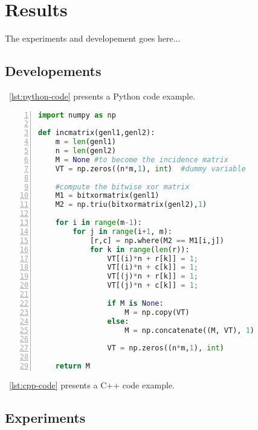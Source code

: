 \chapter{Results}\label{chap:Results}

The experiments and developement goes here...


\section{Developements} \label{sec:dev}


\lstlistingname~\ref{lst:python-code} presents a Python code example.

\begin{lstlisting}[numbers=left, language=Python, style=mycode, caption={Python code example.}, label={lst:python-code}]
import numpy as np
 
def incmatrix(genl1,genl2):
    m = len(genl1)
    n = len(genl2)
    M = None #to become the incidence matrix
    VT = np.zeros((n*m,1), int)  #dummy variable
 
    #compute the bitwise xor matrix
    M1 = bitxormatrix(genl1)
    M2 = np.triu(bitxormatrix(genl2),1) 
 
    for i in range(m-1):
        for j in range(i+1, m):
            [r,c] = np.where(M2 == M1[i,j])
            for k in range(len(r)):
                VT[(i)*n + r[k]] = 1;
                VT[(i)*n + c[k]] = 1;
                VT[(j)*n + r[k]] = 1;
                VT[(j)*n + c[k]] = 1;
 
                if M is None:
                    M = np.copy(VT)
                else:
                    M = np.concatenate((M, VT), 1)
 
                VT = np.zeros((n*m,1), int)
 
    return M
\end{lstlisting}

\lstlistingname~\ref{lst:cpp-code} presents a C++ code example.




\section{Experiments} \label{sec:exp}



